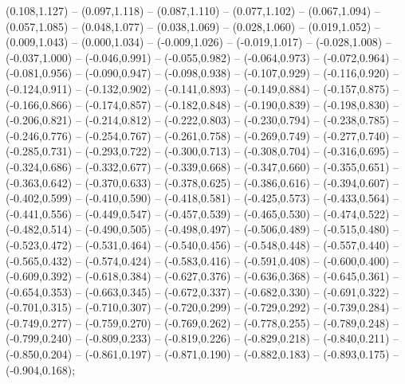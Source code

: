 (0.108,1.127) -- (0.097,1.118) -- (0.087,1.110) -- (0.077,1.102) -- (0.067,1.094) -- (0.057,1.085) -- (0.048,1.077) -- (0.038,1.069) -- (0.028,1.060) -- (0.019,1.052) -- (0.009,1.043) -- (0.000,1.034) -- (-0.009,1.026) -- (-0.019,1.017) -- (-0.028,1.008) -- (-0.037,1.000) -- (-0.046,0.991) -- (-0.055,0.982) -- (-0.064,0.973) -- (-0.072,0.964) -- (-0.081,0.956) -- (-0.090,0.947) -- (-0.098,0.938) -- (-0.107,0.929) -- (-0.116,0.920) -- (-0.124,0.911) -- (-0.132,0.902) -- (-0.141,0.893) -- (-0.149,0.884) -- (-0.157,0.875) -- (-0.166,0.866) -- (-0.174,0.857) -- (-0.182,0.848) -- (-0.190,0.839) -- (-0.198,0.830) -- (-0.206,0.821) -- (-0.214,0.812) -- (-0.222,0.803) -- (-0.230,0.794) -- (-0.238,0.785) -- (-0.246,0.776) -- (-0.254,0.767) -- (-0.261,0.758) -- (-0.269,0.749) -- (-0.277,0.740) -- (-0.285,0.731) -- (-0.293,0.722) -- (-0.300,0.713) -- (-0.308,0.704) -- (-0.316,0.695) -- (-0.324,0.686) -- (-0.332,0.677) -- (-0.339,0.668) -- (-0.347,0.660) -- (-0.355,0.651) -- (-0.363,0.642) -- (-0.370,0.633) -- (-0.378,0.625) -- (-0.386,0.616) -- (-0.394,0.607) -- (-0.402,0.599) -- (-0.410,0.590) -- (-0.418,0.581) -- (-0.425,0.573) -- (-0.433,0.564) -- (-0.441,0.556) -- (-0.449,0.547) -- (-0.457,0.539) -- (-0.465,0.530) -- (-0.474,0.522) -- (-0.482,0.514) -- (-0.490,0.505) -- (-0.498,0.497) -- (-0.506,0.489) -- (-0.515,0.480) -- (-0.523,0.472) -- (-0.531,0.464) -- (-0.540,0.456) -- (-0.548,0.448) -- (-0.557,0.440) -- (-0.565,0.432) -- (-0.574,0.424) -- (-0.583,0.416) -- (-0.591,0.408) -- (-0.600,0.400) -- (-0.609,0.392) -- (-0.618,0.384) -- (-0.627,0.376) -- (-0.636,0.368) -- (-0.645,0.361) -- (-0.654,0.353) -- (-0.663,0.345) -- (-0.672,0.337) -- (-0.682,0.330) -- (-0.691,0.322) -- (-0.701,0.315) -- (-0.710,0.307) -- (-0.720,0.299) -- (-0.729,0.292) -- (-0.739,0.284) -- (-0.749,0.277) -- (-0.759,0.270) -- (-0.769,0.262) -- (-0.778,0.255) -- (-0.789,0.248) -- (-0.799,0.240) -- (-0.809,0.233) -- (-0.819,0.226) -- (-0.829,0.218) -- (-0.840,0.211) -- (-0.850,0.204) -- (-0.861,0.197) -- (-0.871,0.190) -- (-0.882,0.183) -- (-0.893,0.175) -- (-0.904,0.168);
